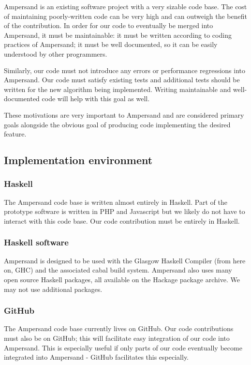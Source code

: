\documentclass[12pt]{report}
\begin{document}
Ampersand is an existing software project with a very sizable code base. The
cost of maintaining poorly-written code can be very high and can outweigh the
benefit of the contribution. In order for our code to eventually be merged into
Ampersand, it must be maintainable: it must be written according to coding
practices of Ampersand; it must be well documented, so it can be easily
understood by other programmers. 

Similarly, our code must not introduce any errors or performance regressions
into Ampersand. Our code must satisfy existing tests and additional tests should
be written for the new algorithm being implemented. Writing maintainable and
well-documented code will help with this goal as well.

These motivations are very important to Ampersand and are considered primary
goals alongside the obvious goal of producing code implementing the desired
feature.

\subsection{Implementation environment}
\subsubsection*{Haskell}
The Ampersand code base is written almost entirely in Haskell. Part of the
prototype software is written in PHP and Javascript %
but we likely do not have to interact with this code base. Our code contribution
must be entirely in Haskell.

\subsubsection*{Haskell software}
Ampersand is designed to be used with the Glasgow Haskell Compiler (from here on, GHC) %
and the associated cabal build system. %
Ampersand also uses many open source Haskell packages, all available on the
Hackage package archive. %
We may not use additional packages. %


\subsubsection*{GitHub}
The Ampersand code base currently lives on GitHub. Our code contributions must
also be on GitHub; this will facilitate easy integration of our code into
Ampersand. This is especially useful if only parts of our code eventually become
integrated into Ampersand - GitHub facilitates this especially. 
%
\end{document}
